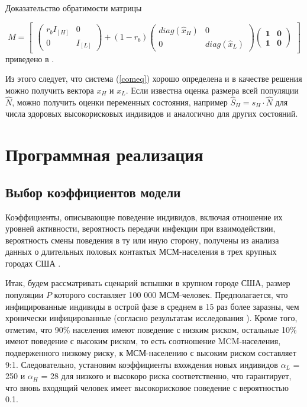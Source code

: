 \documentclass[a4paper]{report}
\begin{document}
	Доказательство обратимости матрицы 
	
	\begin{equation}
	M = \begin{bmatrix}
	\begin{pmatrix}
	r_b I_{\left[ H \right]} & 0\\
	0& I_{\left[ L \right]}
	\end{pmatrix}
	+ (1 - r_b)
	\begin{pmatrix}
	diag(\hat{x}_H) & 0\\
	0& diag(\hat{x}_L)
	\end{pmatrix}
	\begin{pmatrix}
	\textbf{1} & \textbf{0}\\
	\textbf{1} & \textbf{0}
	\end{pmatrix}
	\end{bmatrix}
	\end{equation}
	приведено в \cite{link22}.
	
	Из этого следует, что система (\ref{comeq}) хорошо определена и в качестве решения можно получить вектора $x_H$ и $x_L$. Если известна оценка размера всей популяции $\hat{N}$, можно получить оценки переменных состояния, например $\hat{S}_H = s_H \cdot \hat{N}$ для числа здоровых высокорисковых индивидов и аналогично для других состояний.
	
	
	
	
	\chapter{Программная реализация}
	
		\section{Выбор коэффициентов модели}
	
	Коэффициенты, описывающие поведение индивидов, включая отношение их уровней активности, вероятность передачи инфекции при взаимодействии, вероятность смены поведения в ту или иную сторону, получены из анализа данных о длительных половых контактых МСМ-населения в трех крупных городах США \cite{link23, link22}.
	
	Итак, будем рассматривать сценарий вспышки в крупном городе США, размер популяции $P$ которого составляет 100 000 МСМ-человек.
	Предполагается, что инфицированные индивиды в острой фазе в среднем в 15 раз более заразны, чем хронически инфицированные (согласно результатам исследования \cite{link24}). Кроме того, отметим, что 90\% населения имеют поведение с низким риском, остальные 10\% имеют поведение с высоким риском, то есть соотношение MCM-населения, подверженного низкому риску, к МСМ-населению с высоким риском составляет 9:1. Следовательно, установим коэффициенты вхождения новых индивидов $\alpha_L$ = 250 и $\alpha_H$ = 28 для низкого и высокоро риска соответственно, что гарантирует, что вновь входящий человек имеет высокорисковое поведение с вероятностью 0.1.
	
\end{document}
